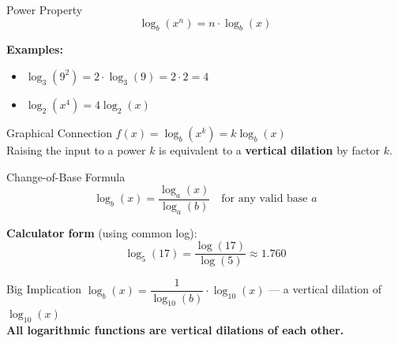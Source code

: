 \documentclass[aspectratio=169, 11pt]{beamer}
\begin{document}
\begin{frame}[t, plain]

  \vspace{0.2cm}
  \begin{block}{Power Property}
    \[ \log_b(x^n) = n \cdot \log_b(x) \]
  \end{block}

  \vspace{0.3cm}
  \textbf{Examples:}
  \begin{itemize}
    \setlength{\itemsep}{6pt}
    \item $\log_3(9^2) = 2 \cdot \log_3(9) = 2 \cdot 2 = 4$
    \item $\log_2(x^4) = 4\log_2(x)$
  \end{itemize}

  \vspace{0.35cm}
  \begin{block}{Graphical Connection}
    $f(x) = \log_b(x^k) = k\log_b(x)$\\[4pt]
    Raising the input to a power $k$ is equivalent to a
    \textbf{vertical dilation} by factor $k$.
  \end{block}
\end{frame}

\begin{frame}[t, plain]

  \vspace{0.2cm}
  \begin{block}{Change-of-Base Formula}
    \[ \log_b(x) = \frac{\log_a(x)}{\log_a(b)} \quad \text{for any valid base } a \]
  \end{block}

  \vspace{0.3cm}
  \textbf{Calculator form} (using common log):
  \[ \log_5(17) = \frac{\log(17)}{\log(5)} \approx 1.760 \]

  \vspace{0.25cm}
  \begin{block}{Big Implication}
    $\log_b(x) = \dfrac{1}{\log_{10}(b)} \cdot \log_{10}(x)$ \quad --- a vertical dilation of $\log_{10}(x)$\\[4pt]
    \textbf{All logarithmic functions are vertical dilations of each other.}
  \end{block}
\end{frame}
\end{document}
